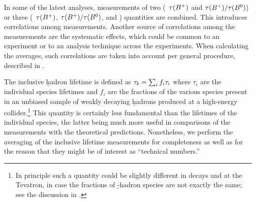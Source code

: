 In some of the latest analyses, measurements of two (\eg\ $\tau(B^+)$ and
$\tau(B^+)/\tau(B^0)$) or three (\eg\ $\tau(B^+)$,
$\tau(B^+)/\tau(B^0)$, and \dmd) quantities are combined.  This
introduces correlations among measurements.  Another source of
correlations among the measurements are the systematic effects, which
could be common to an experiment or to an analysis technique across the
experiments.  When calculating the averages, such correlations are taken
into account per general procedure, described in
.



The inclusive \b hadron lifetime is defined as $\tau_{b} = \sum_i f_i
\tau_i$ where $\tau_i$ are the individual species lifetimes and $f_i$ are
the fractions of the various species present in an unbiased sample of
weakly decaying \b hadrons produced at a high-energy
collider.\footnote{In principle such a quantity could be slightly
different in  decays and at the Tevatron, in case the
fractions of \b-hadron species are not exactly the same; see the
discussion in .}  This quantity is certainly
less fundamental than the lifetimes of the individual species, the
latter being much more useful in comparisons of the measurements with
the theoretical predictions.  Nonetheless, we perform the averaging of
the inclusive lifetime measurements for completeness as well as for the
reason that they might be of interest as ``technical numbers.''


